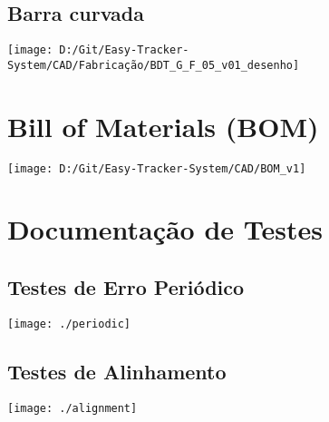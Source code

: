 \documentclass[oneside,openright,12pt]{ufsm_2015} %
\newcommand{\arduinominted}[1]{\inputminted[breaklines=true, baselinestretch = 0.9]{arduino}{E:/Git/Easy-Tracker-System/src/main/#1}}
\begin{document}
\section{Barra curvada}
\label{apendice:barracurvada}
\texttt{[image: D:/Git/Easy-Tracker-System/CAD/Fabricação/BDT\_G\_F\_05\_v01\_desenho]}


\chapter{Bill of Materials (BOM)}

\label{apendice:bom}
\texttt{[image: D:/Git/Easy-Tracker-System/CAD/BOM\_v1]}


\chapter{Documentação de Testes}


\section{Testes de Erro Periódico}
\label{apendice:periodic}
\texttt{[image: ./periodic]}

\section{Testes de Alinhamento}
\label{apendice:alignment}
\texttt{[image: ./alignment]}







\end{document}
